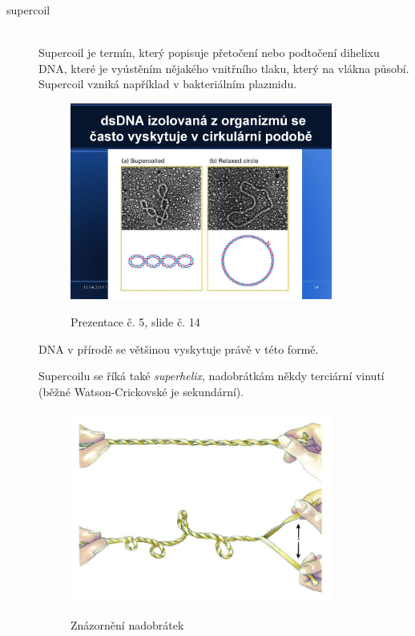 \documentclass[DIV=8]{scrreprt}
\begin{document}
\begin{description}
\item[supercoil]\hfill \\
Supercoil je termín, který popisuje přetočení nebo podtočení dihelixu DNA, které je vyústěním nějakého vnitřního tlaku, který na vlákna působí. Supercoil vzniká například v bakteriálním plazmidu. \begin{figure}
    \caption{Prezentace č. 5, slide č. 14}
    \includegraphics[width=0.85\textwidth]{slides-5/slide-14.jpg}
    \centering
    \label{slides-5-slide-14}
\end{figure}
 DNA v přírodě se většinou vyskytuje právě v této formě.

Supercoilu se říká také \emph{superhelix}, nadobrátkám někdy terciární vinutí (běžné Watson-Crickovské je sekundární).
\begin{figure}
    \caption{Znázornění nadobrátek}
    \includegraphics[width=0.85\textwidth]{supercoil.jpg}
    \centering
    \label{}
\end{figure}




\end{description}
\end{document}

